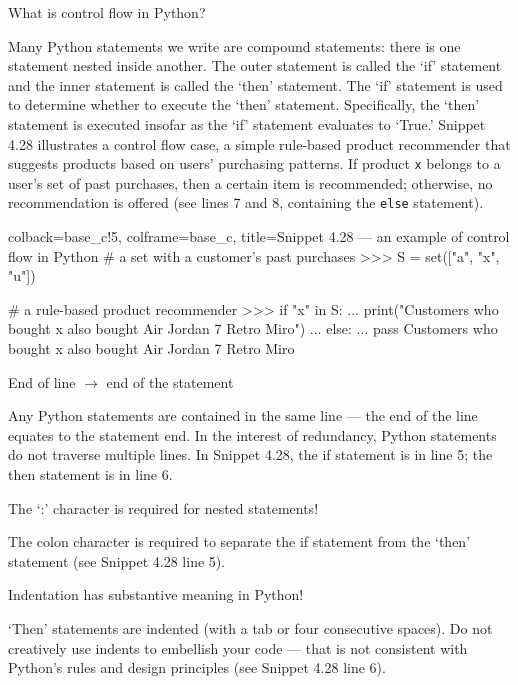 \documentclass[a4paper,11pt]{book}
\numberwithin{figure}{chapter}
\numberwithin{table}{chapter}
\newcommand{\question}[1]{%
    \begin{tcolorbox}[colback=comp_c!10,colframe=comp_c,sidebyside align=top,width=\linewidth,before skip=1ex]
        #1
    \end{tcolorbox}
    \switchcolumn%
}
\newcommand{\note}[1]{%
    \begin{tcolorbox}[colback=white!0,colframe=white!10,width=\linewidth,before skip=1ex]
        #1
    \end{tcolorbox}
}
\begin{document}
\begin{paracol}{2}
\question{\raggedright What is control flow in Python?}
\note{Many Python statements we write are compound statements: there is one statement nested inside another. The outer statement is called the `if' statement and the inner statement is called the `then' statement. The `if' statement is used to determine whether to execute the `then' statement. Specifically, the `then' statement is executed insofar as the `if' statement evaluates to `True.' Snippet 4.28 illustrates a control flow case, a simple rule-based product recommender that suggests products based on users' purchasing patterns. If product \texttt{x} belongs to a user's set of past purchases, then a certain item is recommended; otherwise, no recommendation is offered (see lines 7 and 8, containing the \texttt{else} statement).} 
\end{paracol}

\begin{pythoncode}[linenos=true,]{colback=base_c!5, colframe=base_c, title=\sffamily Snippet 4.28 --- an example of control flow in Python}
# a set with a customer's past purchases
>>> S = set(["a", "x", "u"])

# a rule-based product recommender 
>>> if "x" in S:
...     print("Customers who bought x also bought Air Jordan 7 Retro Miro")
... else:
...     pass
Customers who bought x also bought Air Jordan 7 Retro Miro
\end{pythoncode}

\begin{paracol}{2}
	\question{\raggedright End of line $\rightarrow$ end of the statement}
	\note{Any Python statements are contained in the same line --- the end of the line equates to the statement end. In the interest of redundancy, Python statements do not traverse multiple lines. In Snippet 4.28, the if statement is in line 5; the then statement is in line 6.} 
\end{paracol}

\begin{paracol}{2}
	\question{\raggedright The `:' character is required for nested statements!}
	\note{The colon character is required to separate the if statement from the `then' statement (see Snippet 4.28 line 5).}
\end{paracol}	

\begin{paracol}{2}
	\question{\raggedright Indentation has substantive meaning in Python!}
	\note{`Then' statements are indented (with a tab or four consecutive spaces). Do not creatively use indents to embellish your code --- that is not consistent with Python's rules and design principles (see Snippet 4.28 line 6).}
\end{paracol}
\end{document}
